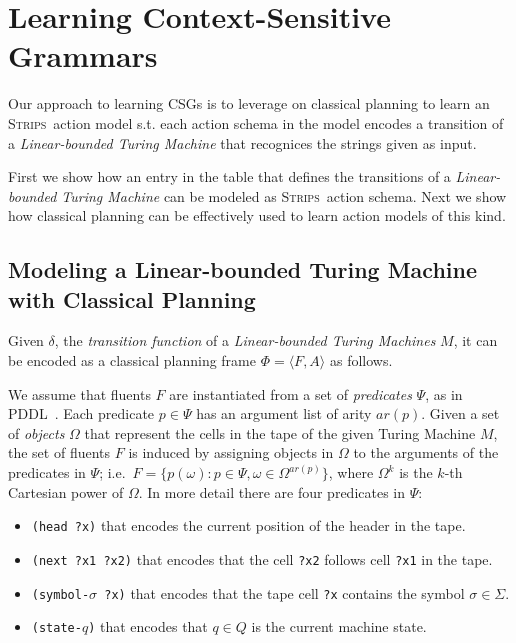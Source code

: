\documentclass[letterpaper]{article} %
\newcommand{\tup}[1]{{\langle #1 \rangle}}
\newcommand{\strips}{\textsc{Strips}}     %
\begin{document}
\section{Learning Context-Sensitive Grammars}

Our approach to learning CSGs is to leverage on classical planning to learn an \strips\ action model s.t. each action schema in the model encodes a transition of a {\em Linear-bounded Turing Machine} that recognices the strings given as input.

First we show how an entry in the table that defines the transitions of a {\em Linear-bounded Turing Machine} can be modeled as \strips\ action schema. Next we show how classical planning can be effectively used to learn action models of this kind.

\subsection{Modeling a Linear-bounded Turing Machine with Classical Planning}
Given $\delta$, the {\em transition function} of a {\em Linear-bounded Turing Machines} $M$, it can be encoded as a classical planning frame $\Phi=\tup{F,A}$ as follows.

We assume that fluents $F$ are instantiated from a set of {\em predicates} $\Psi$, as in PDDL~\cite{fox2003pddl2}. Each predicate $p\in\Psi$ has an argument list of arity $ar(p)$. Given a set of {\em objects} $\Omega$ that represent the cells in the tape of the given Turing Machine $M$, the set of fluents $F$ is induced by assigning objects in $\Omega$ to the arguments of the predicates in $\Psi$; i.e.~$F=\{p(\omega):p\in\Psi,\omega\in\Omega^{ar(p)}\}$, where $\Omega^k$ is the $k$-th Cartesian power of $\Omega$. In more detail there are four predicates in $\Psi$:
\begin{itemize}
\item {\tt (head ?x)} that encodes the current position of the header in the tape.
\item {\tt (next ?x1 ?x2)} that encodes that the cell {\tt ?x2} follows cell {\tt ?x1} in the tape.
\item {\tt (symbol-$\sigma$ ?x)} that encodes that the tape cell {\tt ?x} contains the symbol $\sigma\in\Sigma$.
\item {\tt (state-$q$)} that encodes that $q\in Q$ is the current machine state.
\end{itemize}
\end{document}
